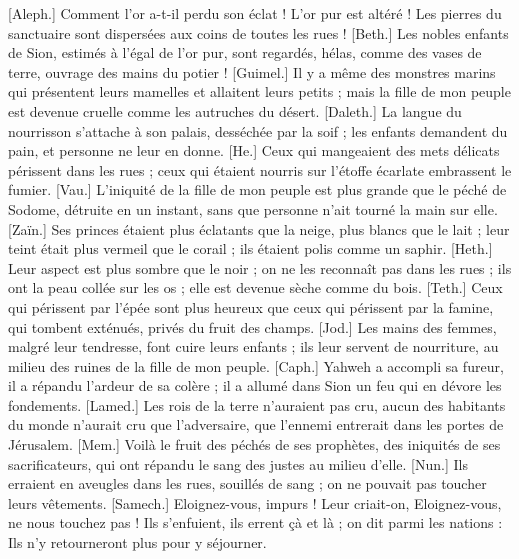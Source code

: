 \begin{multicols}{2}
\VerseOne{}[Aleph.] Comment l’or a-t-il perdu son éclat ! L'or pur est altéré ! Les pierres du sanctuaire sont dispersées aux coins de toutes les rues !
[Beth.] Les nobles enfants de Sion, estimés à l'égal de l'or pur, sont regardés, hélas, comme des vases de terre, ouvrage des mains du potier !
[Guimel.] Il y a même des monstres marins qui présentent leurs mamelles et allaitent leurs petits ; mais la fille de mon peuple est devenue cruelle comme les autruches du désert.
[Daleth.] La langue du nourrisson s'attache à son palais, desséchée par la soif ; les enfants demandent du pain, et personne ne leur en donne.
[He.] Ceux qui mangeaient des mets délicats périssent dans les rues ; ceux qui étaient nourris sur l’étoffe écarlate embrassent le fumier.
[Vau.] L’iniquité de la fille de mon peuple est plus grande que le péché de Sodome, détruite en un instant, sans que personne n’ait tourné la main sur elle.
[Zaïn.] Ses princes étaient plus éclatants que la neige, plus blancs que le lait ; leur teint était plus vermeil que le corail ; ils étaient polis comme un saphir.
[Heth.] Leur aspect est plus sombre que le noir ; on ne les reconnaît pas dans les rues ; ils ont la peau collée sur les os ; elle est devenue sèche comme du bois.
[Teth.] Ceux qui périssent par l’épée sont plus heureux que ceux qui périssent par la famine, qui tombent exténués, privés du fruit des champs.
[Jod.] Les mains des femmes, malgré leur tendresse, font cuire leurs enfants ; ils leur servent de nourriture, au milieu des ruines de la fille de mon peuple.
[Caph.] Yahweh a accompli sa fureur, il a répandu l’ardeur de sa colère ; il a allumé dans Sion un feu qui en dévore les fondements.
[Lamed.] Les rois de la terre n'auraient pas cru, aucun des habitants du monde n'aurait cru que l’adversaire, que l’ennemi entrerait dans les portes de Jérusalem.
[Mem.] Voilà le fruit des péchés de ses prophètes, des iniquités de ses sacrificateurs, qui ont répandu le sang des justes au milieu d’elle.
[Nun.] Ils erraient en aveugles dans les rues, souillés de sang ; on ne pouvait pas toucher leurs vêtements.
[Samech.] Eloignez-vous, impurs ! Leur criait-on, Eloignez-vous, ne nous touchez pas ! Ils s'enfuient, ils errent çà et là ; on dit parmi les nations : Ils n’y retourneront plus pour y séjourner.

\end{multicols}
